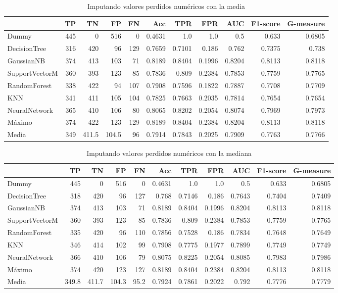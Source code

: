 \documentclass{article}
\begin{document}
\begin{table}[H]
\centering
\caption{Imputando valores perdidos numéricos con la media}
\label{tab:impute-mean}
\begin{tabular}{|lrrrrrrrrrr|}
\hline
 & TP & TN & FP & FN & Acc & TPR & FPR & AUC & F1-score & G-measure\\ \hline
Dummy & 445 & 0 & 516 & 0 & 0.4631 & 1.0 & 1.0 & 0.5 & 0.633 & 0.6805\\
DecisionTree & 316 & 420 & 96 & 129 & 0.7659 & 0.7101 & 0.186 & 0.762 & 0.7375 & 0.738\\
GaussianNB & 374 & 413 & 103 & 71 & 0.8189 & 0.8404 & 0.1996 & 0.8204 & 0.8113 & 0.8118\\
SupportVectorM & 360 & 393 & 123 & 85 & 0.7836 & 0.809 & 0.2384 & 0.7853 & 0.7759 & 0.7765\\
RandomForest & 338 & 422 & 94 & 107 & 0.7908 & 0.7596 & 0.1822 & 0.7887 & 0.7708 & 0.7709\\
KNN & 341 & 411 & 105 & 104 & 0.7825 & 0.7663 & 0.2035 & 0.7814 & 0.7654 & 0.7654\\
NeuralNetwork & 365 & 410 & 106 & 80 & 0.8065 & 0.8202 & 0.2054 & 0.8074 & 0.7969 & 0.7973\\ \hline
Máximo & 374 & 422 & 123 & 129 & 0.8189 & 0.8404 & 0.2384 & 0.8204 & 0.8113 & 0.8118\\
Media & 349 & 411.5 & 104.5 & 96 & 0.7914 & 0.7843 & 0.2025 & 0.7909 & 0.7763 & 0.7766\\
\hline
\end{tabular}
\end{table}

\begin{table}[H]
\centering
\caption{Imputando valores perdidos numéricos con la mediana}
\label{tab:impute-median}
\begin{tabular}{|lrrrrrrrrrr|}
\hline
 & TP & TN & FP & FN & Acc & TPR & FPR & AUC & F1-score & G-measure\\ \hline
Dummy & 445 & 0 & 516 & 0 & 0.4631 & 1.0 & 1.0 & 0.5 & 0.633 & 0.6805\\
DecisionTree & 318 & 420 & 96 & 127 & 0.768 & 0.7146 & 0.186 & 0.7643 & 0.7404 & 0.7409\\
GaussianNB & 374 & 413 & 103 & 71 & 0.8189 & 0.8404 & 0.1996 & 0.8204 & 0.8113 & 0.8118\\
SupportVectorM & 360 & 393 & 123 & 85 & 0.7836 & 0.809 & 0.2384 & 0.7853 & 0.7759 & 0.7765\\
RandomForest & 335 & 420 & 96 & 110 & 0.7856 & 0.7528 & 0.186 & 0.7834 & 0.7648 & 0.7649\\
KNN & 346 & 414 & 102 & 99 & 0.7908 & 0.7775 & 0.1977 & 0.7899 & 0.7749 & 0.7749\\
NeuralNetwork & 366 & 410 & 106 & 79 & 0.8075 & 0.8225 & 0.2054 & 0.8085 & 0.7983 & 0.7986\\ \hline
Máximo & 374 & 420 & 123 & 127 & 0.8189 & 0.8404 & 0.2384 & 0.8204 & 0.8113 & 0.8118\\
Media & 349.8 & 411.7 & 104.3 & 95.2 & 0.7924 & 0.7861 & 0.2022 & 0.792 & 0.7776 & 0.7779\\
\hline
\end{tabular}
\end{table}
\end{document}
